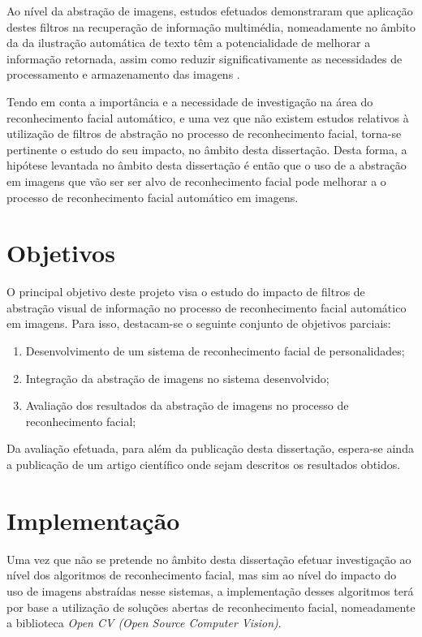 Ao nível da abstração de imagens, estudos efetuados demonstraram que aplicação destes filtros na recuperação de informação multimédia, nomeadamente no âmbito da da ilustração automática de texto têm a potencialidade de melhorar a informação retornada, assim como reduzir significativamente as necessidades de processamento e armazenamento das imagens \citep{Coelho2012}. 

Tendo em conta a importância e a necessidade de investigação na área do reconhecimento facial automático, e uma vez que não existem estudos relativos à utilização de filtros de abstração no processo de reconhecimento facial, torna-se pertinente o estudo do seu impacto, no âmbito desta dissertação. Desta forma, a hipótese levantada no âmbito desta dissertação é então que o uso de a abstração em imagens que vão ser ser alvo de reconhecimento facial pode melhorar a o processo de reconhecimento facial automático em imagens.

\section{Objetivos} \label{sec:objetivosperpectiva}
O principal objetivo deste projeto visa o estudo do impacto de filtros de abstração visual de informação no processo de reconhecimento facial automático em imagens. Para isso, destacam-se o seguinte conjunto de objetivos parciais:

\begin{enumerate}
\item Desenvolvimento de um sistema de reconhecimento facial de personalidades;
\item Integração da abstração de imagens no sistema desenvolvido;
\item Avaliação dos resultados da abstração de imagens no processo de reconhecimento facial;
\end{enumerate}

Da avaliação efetuada, para além da publicação desta dissertação, espera-se ainda a publicação de um artigo científico onde sejam descritos os resultados obtidos.

\section{Implementação} \label{sec:implementacao}

Uma vez que não se pretende no âmbito desta dissertação efetuar investigação ao nível dos algoritmos de reconhecimento facial, mas sim ao nível do impacto do uso de imagens abstraídas nesse sistemas, a implementação desses algoritmos terá por base a utilização de soluções abertas de reconhecimento facial, nomeadamente a biblioteca \textit{Open CV (Open Source Computer Vision)}.

